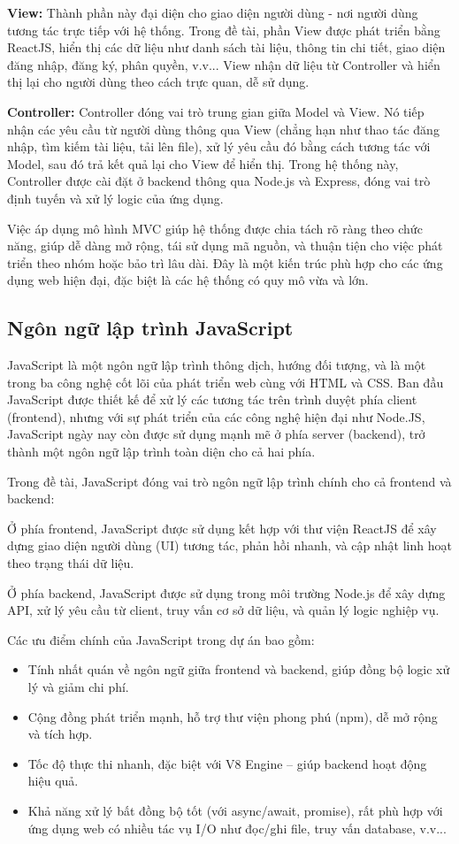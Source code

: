 \documentclass{article}
\begin{document}
	\textbf{View:} Thành phần này đại diện cho giao diện người dùng - nơi người dùng tương tác trực tiếp với hệ thống. Trong đề tài, phần View được phát triển bằng ReactJS, hiển thị các dữ liệu như danh sách tài liệu, thông tin chi tiết, giao diện đăng nhập, đăng ký, phân quyền, v.v... View nhận dữ liệu từ Controller và hiển thị lại cho người dùng theo cách trực quan, dễ sử dụng.
	
	\textbf{Controller:} Controller đóng vai trò trung gian giữa Model và View. Nó tiếp nhận các yêu cầu từ người dùng thông qua View (chẳng hạn như thao tác đăng nhập, tìm kiếm tài liệu, tải lên file), xử lý yêu cầu đó bằng cách tương tác với Model, sau đó trả kết quả lại cho View để hiển thị. Trong hệ thống này, Controller được cài đặt ở backend thông qua Node.js và Express, đóng vai trò định tuyến và xử lý logic của ứng dụng.
	
	Việc áp dụng mô hình MVC giúp hệ thống được chia tách rõ ràng theo chức năng, giúp dễ dàng mở rộng, tái sử dụng mã nguồn, và thuận tiện cho việc phát triển theo nhóm hoặc bảo trì lâu dài. Đây là một kiến trúc phù hợp cho các ứng dụng web hiện đại, đặc biệt là các hệ thống có quy mô vừa và lớn.
	
	\subsection{Ngôn ngữ lập trình JavaScript}
	
	JavaScript là một ngôn ngữ lập trình thông dịch, hướng đối tượng, và là một trong ba công nghệ cốt lõi của phát triển web cùng với HTML và CSS. Ban đầu JavaScript được thiết kế để xử lý các tương tác trên trình duyệt phía client (frontend), nhưng với sự phát triển của các công nghệ hiện đại như Node.JS, JavaScript ngày nay còn được sử dụng mạnh mẽ ở phía server (backend), trở thành một ngôn ngữ lập trình toàn diện cho cả hai phía.
	
	Trong đề tài, JavaScript đóng vai trò ngôn ngữ lập trình chính cho cả frontend và backend:
	
	Ở phía frontend, JavaScript được sử dụng kết hợp với thư viện ReactJS để xây dựng giao diện người dùng (UI) tương tác, phản hồi nhanh, và cập nhật linh hoạt theo trạng thái dữ liệu.
	
	Ở phía backend, JavaScript được sử dụng trong môi trường Node.js để xây dựng API, xử lý yêu cầu từ client, truy vấn cơ sở dữ liệu, và quản lý logic nghiệp vụ.
	
	Các ưu điểm chính của JavaScript trong dự án bao gồm:
	\begin{itemize}
		\item Tính nhất quán về ngôn ngữ giữa frontend và backend, giúp đồng bộ logic xử lý và giảm chi phí.
		\item Cộng đồng phát triển mạnh, hỗ trợ thư viện phong phú (npm), dễ mở rộng và tích hợp.
		\item Tốc độ thực thi nhanh, đặc biệt với V8 Engine – giúp backend hoạt động hiệu quả.
		\item Khả năng xử lý bất đồng bộ tốt (với async/await, promise), rất phù hợp với ứng dụng web có nhiều tác vụ I/O như đọc/ghi file, truy vấn database, v.v...
	\end{itemize}
	
\end{document}
